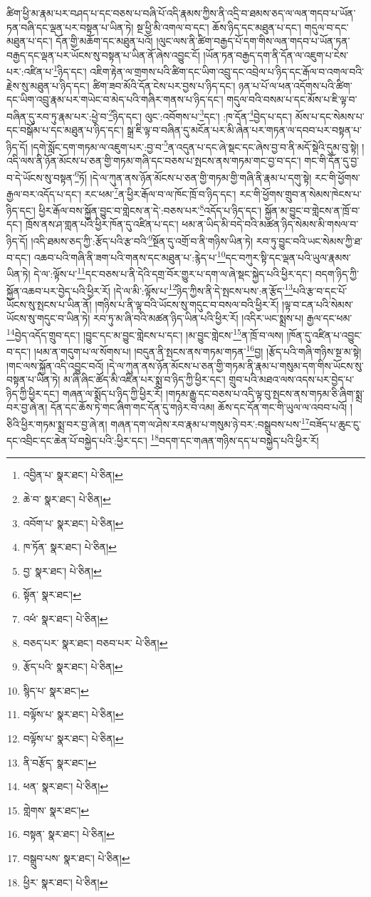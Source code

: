 ཚིག་ཕྱི་མ་རྣམ་པར་བཤད་པ་དང་བཅས་པ་བཞི་པོ་འདི་རྣམས་ཀྱིས་ནི་འདྲི་བ་ཐམས་ཅད་ལ་ལན་གདབ་པ་ཡོན་ཏན་བཞི་དང་ལྡན་པར་བསྟན་པ་ཡིན་ཏེ། སྔ་ཕྱི་མི་འགལ་བ་དང་། ཆོས་ཉིད་དང་མཐུན་པ་དང་། གདུལ་བ་དང་མཐུན་པ་དང་། དོན་གྱི་མཆོག་དང་མཐུན་པའོ། །ལུང་ལས་ནི་ཚིག་བརྒྱད་པོ་དག་གིས་ལན་གདབ་པ་ཡོན་ཏན་བརྒྱད་དང་ལྡན་པར་ཡོངས་སུ་བསྟན་པ་ཡིན་ནོ་ཞེས་འབྱུང་ངོ། །ཡོན་ཏན་བརྒྱད་དག་ནི་དོན་ལ་འཇུག་པ་ངེས་པར་:འཛིན་པ་\footnote{འབྱིན་པ་  སྣར་ཐང་།  པེ་ཅིན། }ཉིད་དང་། འཇིག་རྟེན་ལ་གྲགས་པའི་ཚིག་དང་ཡིག་འབྲུ་དང་འབྲེལ་པ་ཉིད་དང་རྒོལ་བ་འགལ་བའི་རྗེས་སུ་མཐུན་པ་ཉིད་དང་། ཚིག་ཟབ་མོའི་དོན་ངེས་པར་བྱས་པ་ཉིད་དང་། ཉན་པ་པོ་ལ་ཕན་འདོགས་པའི་ཚིག་དང་ཡིག་འབྲུ་རྣམ་པར་གཡེང་བ་མེད་པའི་གཞིར་གནས་པ་ཉིད་དང་། གདུལ་བའི་བསམ་པ་དང་མོས་པ་ཇི་ལྟ་བ་བཞིན་དུ་རབ་ཏུ་རྣམ་པར་:ཕྱེ་བ་\footnote{ཆེ་བ་  སྣར་ཐང་།  པེ་ཅིན། }ཉིད་དང་། ལུང་:འབོགས་པ་\footnote{འབོག་པ་  སྣར་ཐང་།  པེ་ཅིན། }དང་། :ཁ་དོན་\footnote{ཁ་ཏོན་  སྣར་ཐང་།  པེ་ཅིན། }བྱེད་པ་དང་། མོས་པ་དང་སེམས་པ་དང་བསྒོམ་པ་དང་མཐུན་པ་ཉིད་དང་། སྒྲ་ཇི་ལྟ་བ་བཞིན་དུ་མངོན་པར་མི་ཞེན་པར་གཏན་ལ་དབབ་པར་བསྟན་པ་ཉིད་དོ། །དགེ་སློང་དག་གཏམ་ལ་འཇུག་པར་:བྱ་བ་\footnote{བྱ་  སྣར་ཐང་།  པེ་ཅིན། }ན་འདུན་པ་དང་ཞེ་སྡང་དང་ཞེས་བྱ་བ་ནི་མདོ་སྡེའི་དུམ་བུ་སྟེ། །འདི་ལས་ནི་ཉོན་མོངས་པ་ཅན་གྱི་གཏམ་གཞི་དང་བཅས་པ་སྤངས་ནས་གཏམ་གང་བྱ་བ་དང་། གང་གི་དོན་དུ་བྱ་བ་དེ་ཡོངས་སུ་བསྟན་\footnote{སྟོན་  སྣར་ཐང་། }ཏོ། །དེ་ལ་ཀུན་ནས་ཉོན་མོངས་པ་ཅན་གྱི་གཏམ་གྱི་གཞི་ནི་རྣམ་པ་དགུ་སྟེ། རང་གི་ཕྱོགས་རྒྱལ་བར་འདོད་པ་དང་། རང་ཕམ་\footnote{འཕཾ་  སྣར་ཐང་།  པེ་ཅིན། }ན་ཕྱིར་རྒོལ་བ་ལ་ཁོང་ཁྲོ་བ་ཉིད་དང་། རང་གི་ཕྱོགས་གྲུབ་ན་སེམས་ཁེངས་པ་ཉིད་དང་། ཕྱིར་རྒོལ་བས་སྐྱོན་བྱུང་བ་གླེངས་ན་དེ་:བཅས་པར་\footnote{བཅད་པར་  སྣར་ཐང་། བཅབ་པར་  པེ་ཅིན། }འདོད་པ་ཉིད་དང་། སྐྱོན་མ་བྱུང་བ་གླེངས་ན་ཁྲོ་བ་དང་། ཁྲོས་ནས་ཤ་གླན་པའི་ཕྱིར་ཁོན་དུ་འཛིན་པ་དང་། ཕམ་ན་ཡིད་མི་བདེ་བའི་མཚན་ཉིད་སེམས་མི་གསལ་བ་ཉིད་དོ། །འདི་ཐམས་ཅད་ཀྱི་:རྩོད་པའི་རྩ་བའི་\footnote{རྩོད་པའི་  སྣར་ཐང་།  པེ་ཅིན། }སྔོན་དུ་འགྲོ་བ་ནི་གཉིས་ཡིན་ཏེ། རབ་ཏུ་བྱུང་བའི་ཡང་སེམས་ཀྱི་ཐ་བ་དང་། འཆབ་པའི་གཞི་ནི་ཟག་པའི་གནས་དང་མཐུན་པ་:རྙེད་པ་\footnote{སྙིད་པ་  སྣར་ཐང་། }དང་བཀུར་སྟི་དང་ལྡན་པའི་ཡུལ་རྣམས་ཡིན་ཏེ། དེ་ལ་:ལྟོས་པ་\footnote{བལྟོས་པ་  སྣར་ཐང་།  པེ་ཅིན། }དང་བཅས་པ་ནི་དེའི་དགྲ་བོར་གྱུར་པ་དག་ལ་ཞེ་སྡང་སྐྱེད་པའི་ཕྱིར་དང་། བདག་ཉིད་ཀྱི་སྐྱོན་འཆབ་པར་བྱེད་པའི་ཕྱིར་རོ། །དེ་ལ་མི་:ལྟོས་པ་\footnote{བལྟོས་པ་  སྣར་ཐང་།  པེ་ཅིན། }ཉིད་ཀྱིས་ནི་དེ་སྤངས་པས་:ན་རྩོད་\footnote{ནི་བརྩོད་  སྣར་ཐང་། }པའི་རྩ་བ་དང་པོ་ཡོངས་སུ་སྤངས་པ་ཡིན་ནོ། །གཉིས་པ་ནི་ལྟ་བའི་ཡོངས་སུ་གདུང་བ་བསལ་བའི་ཕྱིར་རོ། །ལྟ་བ་ངན་པའི་སེམས་ཡོངས་སུ་གདུང་བ་ཡིན་ཏེ། རབ་ཏུ་མ་ཞི་བའི་མཚན་ཉིད་ཡིན་པའི་ཕྱིར་རོ། །འདིར་ཡང་སྨྲས་པ། རྒྱལ་དང་ཕམ་\footnote{ཕན་  སྣར་ཐང་།  པེ་ཅིན། }བྱེད་འདོད་གྲུབ་དང་། །བྱུང་དང་མ་བྱུང་གླེངས་པ་དང་། །མ་བྱུང་གླེངས་\footnote{གླེགས་  སྣར་ཐང་། }ན་ཁྲོ་བ་ལས། །ཁོན་དུ་འཛིན་པ་འབྱུང་བ་དང་། །ཕམ་ན་གདུག་པ་ལ་སོགས་པ། །བདུན་ནི་སྤངས་ནས་གཏམ་གཏན་\footnote{བསྟན་  སྣར་ཐང་།  པེ་ཅིན། }བྱ། །རྩོད་པའི་གཞི་གཉིས་སྔ་མ་སྟེ། །གང་ལས་སྐྱོན་འདི་འབྱུང་བའོ། །དེ་ལ་ཀུན་ནས་ཉོན་མོངས་པ་ཅན་གྱི་གཏམ་ནི་རྣམ་པ་གསུམ་དག་གིས་ཡོངས་སུ་བསྟན་པ་ཡིན་ཏེ། མ་ཞི་ཞིང་ཚོད་མི་འཛིན་པར་སྨྲ་བ་ཉིད་ཀྱི་ཕྱིར་དང་། གྲུབ་པའི་མཐའ་ལས་འདས་པར་བྱེད་པ་ཉིད་ཀྱི་ཕྱིར་དང་། གཞན་ལ་སྨོད་པ་ཉིད་ཀྱི་ཕྱིར་རོ། །གཏམ་རྒྱུ་དང་བཅས་པ་འདི་ལྟ་བུ་སྤངས་ནས་གཏམ་ཅི་ཞིག་སྨྲ་བར་བྱ་ཞེ་ན། དོན་དང་ཆོས་ཏེ་གང་ཞིག་གང་དོན་དུ་གཉེར་བ་འམ། ཆོས་དང་དོན་གང་གི་ཡུལ་ལ་འབབ་པའོ། །ཅིའི་ཕྱིར་གཏམ་སྨྲ་བར་བྱ་ཞེ་ན། གཞན་དག་ལ་ཤེས་རབ་རྣམ་པ་གསུམ་ཉེ་བར་:བསྒྲུབས་པས་\footnote{བསྒྲུབ་པས་  སྣར་ཐང་།  པེ་ཅིན། }བཟོད་པ་ཆུང་ངུ་དང་འབྲིང་དང་ཆེན་པོ་བསྐྱེད་པའི་:ཕྱིར་དང་། \footnote{ཕྱིར་  སྣར་ཐང་།  པེ་ཅིན། }བདག་དང་གཞན་གཉིས་དད་པ་བསྐྱེད་པའི་ཕྱིར་རོ། 